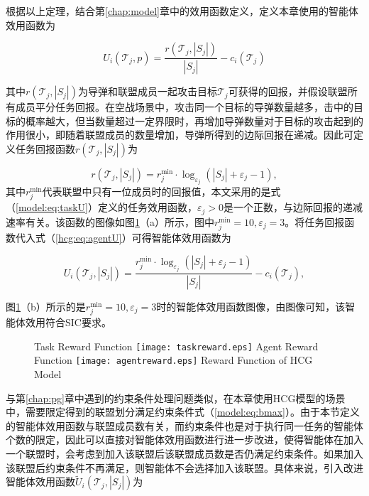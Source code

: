 根据以上定理，结合第\ref{chap:model}章中的效用函数定义，定义本章使用的智能体效用函数为

\begin{equation}
\label{hcg:eq:agentU}
	U_i(\mathcal{T}_j,p) = \frac{r(\mathcal{T}_j,|S_j|)}{|S_j|} - c_i(\mathcal{T}_j)
\end{equation}

其中$r(\mathcal{T}_j,|S_j|)$为导弹和联盟成员一起攻击目标$\mathcal{T}_j$可获得的回报，并假设联盟所有成员平分任务回报。在空战场景中，攻击同一个目标的导弹数量越多，击中的目标的概率越大，但当数量超过一定界限时，再增加导弹数量对于目标的攻击起到的作用很小，即随着联盟成员的数量增加，导弹所得到的边际回报在递减。因此可定义任务回报函数$r(\mathcal{T}_j,|S_j|)$为

\begin{equation}
\label{hcg:eq:task_reward}
	r(\mathcal{T}_j,|S_j|) = r_j^{\text{min}} \cdot \log_{\varepsilon_j} (|S_j|+\varepsilon_j-1),
\end{equation}
其中$r_j^{\text{min}}$代表联盟中只有一位成员时的回报值，本文采用的是式（\ref{model:eq:taskU}）定义的任务效用函数，$\varepsilon_j>0$是一个正数，与边际回报的递减速率有关。该函数的图像如图\ref{hcg:fig:rewardfunc}（a）所示，图中$r_j^{\text{min}}=10, \varepsilon_j = 3$。将任务回报函数代入式（\ref{hcg:eq:agentU}）可得智能体效用函数为

\begin{equation}
\label{hcg:eq:agentU_reward}
	U_i(\mathcal{T}_j,|S_j|) = \frac{r_j^{\text{min}} \cdot \log_{\varepsilon_j} (|S_j|+\varepsilon_j-1)}{|S_j|} - c_i(\mathcal{T}_j),
\end{equation}

图\ref{hcg:fig:rewardfunc}（b）所示的是$r_j^{\text{min}}=10,\varepsilon_j=3$时的智能体效用函数图像，由图像可知，该智能体效用符合SIC要求。

\begin{figure}[!hbtp]
  \centering
                  {Task Reward Function}%
                  {\texttt{[image: taskreward.eps]}}
  \hspace{2cm}
                  {Agent Reward Function}%
                  {\texttt{[image: agentreward.eps]}}
            {Reward Function of HCG Model}
  \label{hcg:fig:rewardfunc}
\end{figure}

与第\ref{chap:pg}章中遇到的约束条件处理问题类似，在本章使用HCG模型的场景中，需要限定得到的联盟划分满足约束条件式（\ref{model:eq:bmax}）。由于本节定义的智能体效用函数与联盟成员数有关，而约束条件也是对于执行同一任务的智能体个数的限定，因此可以直接对智能体效用函数进行进一步改进，使得智能体在加入一个联盟时，会考虑到加入该联盟后该联盟成员数是否仍满足约束条件。如果加入该联盟后约束条件不再满足，则智能体不会选择加入该联盟。具体来说，引入改进智能体效用函数$\widetilde U_i(\mathcal{T}_j,|S_j|)$为

